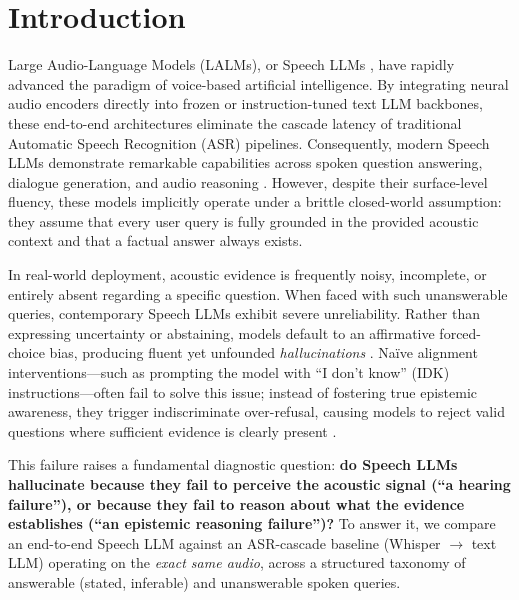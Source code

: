 
\section{Introduction}
\label{sec:introduction}

Large Audio-Language Models (LALMs), or Speech LLMs \cite{chu2024qwen2audio, radford2022whisper}, have rapidly advanced the paradigm of voice-based artificial intelligence. By integrating neural audio encoders directly into frozen or instruction-tuned text LLM backbones, these end-to-end architectures eliminate the cascade latency of traditional Automatic Speech Recognition (ASR) pipelines. Consequently, modern Speech LLMs demonstrate remarkable capabilities across spoken question answering, dialogue generation, and audio reasoning \cite{sakshi2024mmau, wang2025mmsu}. However, despite their surface-level fluency, these models implicitly operate under a brittle closed-world assumption: they assume that every user query is fully grounded in the provided acoustic context and that a factual answer always exists.

In real-world deployment, acoustic evidence is frequently noisy, incomplete, or entirely absent regarding a specific question. When faced with such unanswerable queries, contemporary Speech LLMs exhibit severe unreliability. Rather than expressing uncertainty or abstaining, models default to an affirmative forced-choice bias, producing fluent yet unfounded \textit{hallucinations} \cite{zhao2026halluaudio, kuan2026aquabench}. Naïve alignment interventions---such as prompting the model with ``I don't know'' (IDK) instructions---often fail to solve this issue; instead of fostering true epistemic awareness, they trigger indiscriminate over-refusal, causing models to reject valid questions where sufficient evidence is clearly present \cite{ma2025reliable}.

This failure raises a fundamental diagnostic question: \textbf{do Speech LLMs hallucinate because they fail to perceive the acoustic signal (``a hearing failure''), or because they fail to reason about what the evidence establishes (``an epistemic reasoning failure'')?} To answer it, we compare an end-to-end Speech LLM against an ASR-cascade baseline (Whisper $\rightarrow$ text LLM) operating on the \textit{exact same audio}, across a structured taxonomy of answerable (stated, inferable) and unanswerable spoken queries.

